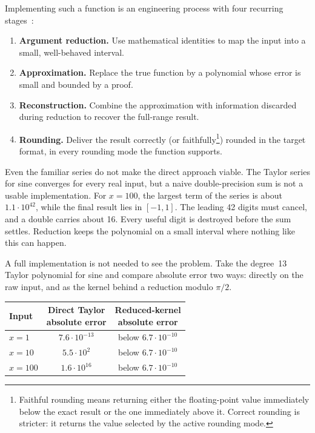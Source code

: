 \documentclass[manuscript, nonacm]{acmart}
\begin{document}
    Implementing such a function is an engineering process with four recurring
    stages~\cite{muller,handbook}:

    \begin{enumerate}
        \item \textbf{Argument reduction.}  Use mathematical identities to map
        the input into a small, well-behaved interval.
        \item \textbf{Approximation.}  Replace the true function by a polynomial
        whose error is small and bounded by a proof.
        \item \textbf{Reconstruction.}  Combine the approximation with information
        discarded during reduction to recover the full-range result.
        \item \textbf{Rounding.}  Deliver the result correctly (or faithfully\footnote{Faithful rounding means returning either the floating-point value immediately below the exact result or the one immediately above it. Correct rounding is stricter: it returns the value selected by the active rounding mode.})
        rounded in the target format, in every rounding mode the function supports.
    \end{enumerate}

    Even the familiar series do not make the direct approach viable. The Taylor
    series for sine converges for every real input, but a naive double-precision
    sum is not a usable implementation. For $x = 100$, the largest term of the
    series is about $1.1 \cdot 10^{42}$, while the final result lies in
    $[-1, 1]$. The leading 42 digits must cancel, and a double carries about
    16. Every useful digit is destroyed before the sum settles. Reduction
    keeps the polynomial on a small interval where nothing like this can
    happen.

    A full implementation is not needed to see the problem. Take the degree~13
    Taylor polynomial for sine and compare absolute error two ways: directly on
    the raw input, and as the kernel behind a reduction modulo $\pi/2$.

    \begin{table}[H]
        \centering
        \begin{tabular}{lcc}
            \toprule
            Input & \shortstack{Direct Taylor\\absolute error}   & \shortstack{Reduced-kernel\\absolute error}  \\
            \midrule
            $x = 1$ & $7.6 \cdot 10^{-13}$  & below $6.7 \cdot 10^{-10}$ \\
            $x = 10$ & $5.5 \cdot 10^{2}$  & below $6.7 \cdot 10^{-10}$ \\
            $x = 100$ & $1.6 \cdot 10^{16}$  & below $6.7 \cdot 10^{-10}$ \\
            \bottomrule
        \end{tabular}
    \end{table}
\end{document}

